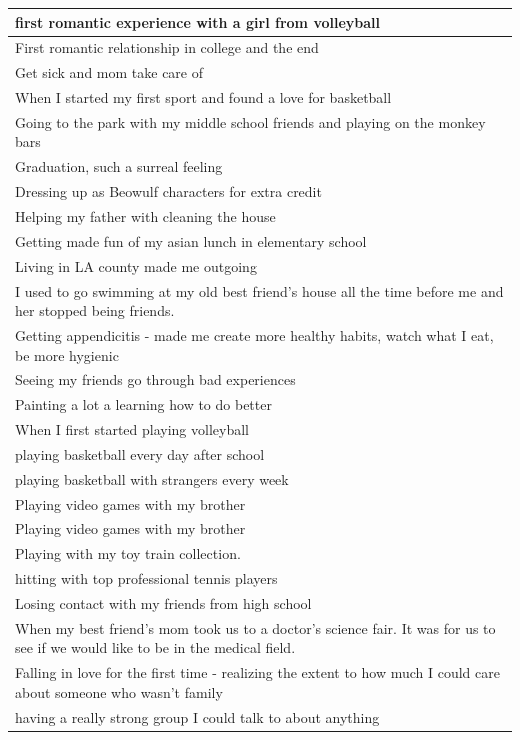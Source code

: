 \documentclass[
  .7em,
  letterpaper,
  DIV=11,
  numbers=noendperiod]{scrartcl}
\begin{document}
\begin{table}
\begin{tabular}{l}
\hline
first romantic experience with a girl from volleyball\\
\hline
First romantic relationship in college and the end\\
\hline
Get sick and mom take care of\\
\hline
When I started my first sport and found a love for basketball\\
\hline
Going to the park with my middle school friends and playing on the monkey bars\\
\hline
Graduation, such a surreal feeling\\
\hline
Dressing up as Beowulf characters for extra credit\\
\hline
Helping my father with cleaning the house\\
\hline
Getting made fun of my asian lunch in elementary school\\
\hline
Living in LA county made me outgoing\\
\hline
I used to go swimming at my old best friend's house all the time before me and her stopped being friends.\\
\hline
Getting appendicitis - made me create more healthy habits, watch what I eat, be more hygienic\\
\hline
Seeing my friends go through bad experiences\\
\hline
Painting a lot a learning how to do better\\
\hline
When I first started playing volleyball\\
\hline
playing basketball every day after school\\
\hline
playing basketball with strangers every week\\
\hline
Playing video games with my brother\\
\hline
Playing video games with my brother\\
\hline
Playing with my toy train collection.\\
\hline
hitting with top professional tennis players\\
\hline
Losing contact with my friends from high school\\
\hline
When my best friend's mom took us to a doctor's science fair. It was for us to see if we would like to be in the medical field.\\
\hline
Falling in love for the first time - realizing the extent to how much I could care about someone who wasn't family\\
\hline
having a really strong group I could talk to about anything\\

\end{tabular}
\end{table}
\end{document}
